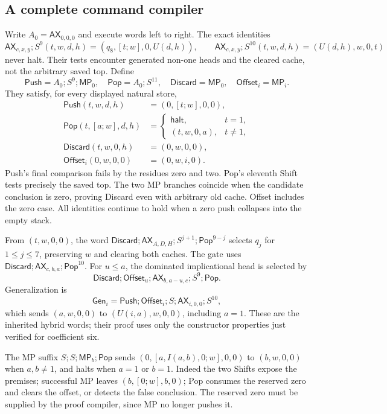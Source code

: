 \subsection{A complete command compiler}

Write $A_0=\mathsf{AX}_{0,0,0}$ and execute words left to right.  The exact
identities
\[
 \mathsf{AX}_{c,x,y};S^9(t,w,d,h)=(q_8,[t;w],0,U(d,h)),\qquad
 \mathsf{AX}_{c,x,y};S^{10}(t,w,d,h)=(U(d,h),w,0,t)
\]
never halt.  Their tests encounter generated non-one heads and the cleared
cache, not the arbitrary saved top.  Define
\[
 \mathsf{Push}=A_0;S^9;\mathsf{MP}_0,\quad
 \mathsf{Pop}=A_0;S^{11},\quad
 \mathsf{Discard}=\mathsf{MP}_0,\quad
 \mathsf{Offset}_i=\mathsf{MP}_i.
\]
They satisfy, for every displayed natural store,
\begin{align*}
 \mathsf{Push}(t,w,d,h)&=(0,[t;w],0,0),\\
 \mathsf{Pop}(t,[a;w],d,h)&=
  \begin{cases}\mathsf{halt},&t=1,\\(t,w,0,a),&t\ne1,\end{cases}\\
 \mathsf{Discard}(t,w,0,h)&=(0,w,0,0),\\
 \mathsf{Offset}_i(0,w,0,0)&=(0,w,i,0).
\end{align*}
Push's final comparison fails by the residues zero and two.  Pop's eleventh
Shift tests precisely the saved top.  The two MP branches coincide when
the candidate conclusion is zero, proving Discard even with arbitrary old
cache.  Offset includes the zero case.  All identities continue to hold
when a zero push collapses into the empty stack.

From $(t,w,0,0)$, the word
$\mathsf{Discard};\mathsf{AX}_{A,D,H};S^{j+1};\mathsf{Pop}^{9-j}$ selects
$q_j$ for $1\le j\le7$, preserving $w$ and clearing both caches.  The gate
uses $\mathsf{Discard};\mathsf{AX}_{c,b,a};\mathsf{Pop}^{10}$.
For $u\le a$, the dominated implicational head is selected by
\[
 \mathsf{Discard};\mathsf{Offset}_u;
 \mathsf{AX}_{b,a-u,c};S^9;\mathsf{Pop}.
\]
Generalization is
\[
 \mathsf{Gen}_i=\mathsf{Push};\mathsf{Offset}_i;S;
                  \mathsf{AX}_{i,0,0};S^{10},
\]
which sends $(a,w,0,0)$ to $(U(i,a),w,0,0)$, including $a=1$.
These are the inherited hybrid words; their proof uses only the constructor
properties just verified for coefficient six.

The MP suffix $S;S;\mathsf{MP}_b;\mathsf{Pop}$ sends
$(0,[a,I(a,b),0;w],0,0)$ to $(b,w,0,0)$ when $a,b\ne1$, and halts when
$a=1$ or $b=1$.  Indeed the two Shifts expose the premises; successful MP
leaves $(b,[0;w],b,0)$; Pop consumes the reserved zero and clears the offset,
or detects the false conclusion.  The reserved zero must be supplied by
the proof compiler, since MP no longer pushes it.


